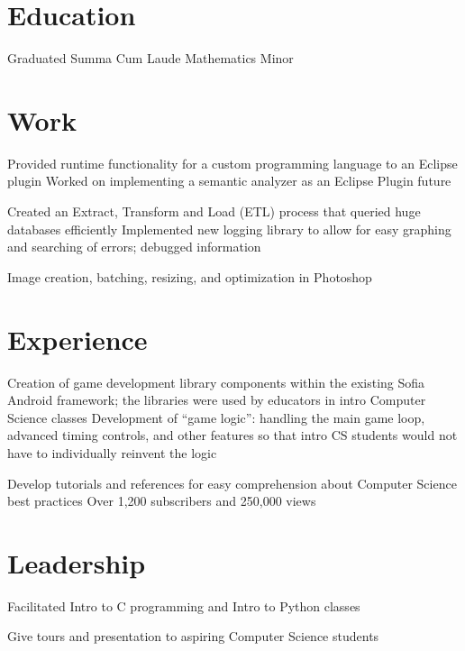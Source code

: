 \documentclass{my_cv}
\begin{document}

\section{Education}
\workitemstwo
{Graduated Summa Cum Laude }
{Mathematics Minor}
 
\section{Work}
\workitemstwo
{Provided runtime functionality for a custom programming language to an Eclipse plugin}
{Worked on implementing a semantic analyzer as an Eclipse Plugin future}

\workitemstwo
{Created an Extract, Transform and Load (ETL) process that queried huge databases efficiently  }
{Implemented new logging library to allow for easy graphing and searching of errors; debugged information}

\workitemsone
{Image creation, batching, resizing, and optimization in Photoshop}

\section{Experience}
\workitemstwo
{Creation of game development library components within the existing Sofia Android framework; the libraries were used by educators in intro Computer Science classes }
{Development of “game logic”: handling the main game loop, advanced timing controls, and other features so that intro CS students would not have to individually reinvent the logic}

\workitemstwo
{Develop tutorials and references for easy comprehension about Computer Science best practices }
{Over 1,200 subscribers and 250,000 views}

\section{Leadership}



\workitemsone
 {Facilitated Intro to C programming and Intro to Python classes}

\workitemsone
 {Give tours and presentation to aspiring Computer Science students}
\end{document}
